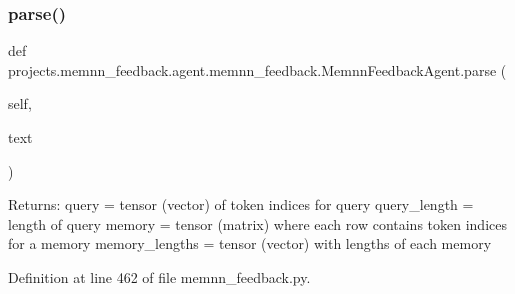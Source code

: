\mbox{\label{classprojects_1_1memnn__feedback_1_1agent_1_1memnn__feedback_1_1MemnnFeedbackAgent_abe550254c04f404d488de04a0def4df1}} 
\subsubsection{\texorpdfstring{parse()}{parse()}}
{\footnotesize\ttfamily def projects.\+memnn\+\_\+feedback.\+agent.\+memnn\+\_\+feedback.\+Memnn\+Feedback\+Agent.\+parse (\begin{DoxyParamCaption}\item[{}]{self,  }\item[{}]{text }\end{DoxyParamCaption})}

\begin{DoxyVerb}Returns:
    query = tensor (vector) of token indices for query
    query_length = length of query
    memory = tensor (matrix) where each row contains token indices for a memory
    memory_lengths = tensor (vector) with lengths of each memory
\end{DoxyVerb}
 

Definition at line 462 of file memnn\+\_\+feedback.\+py.


